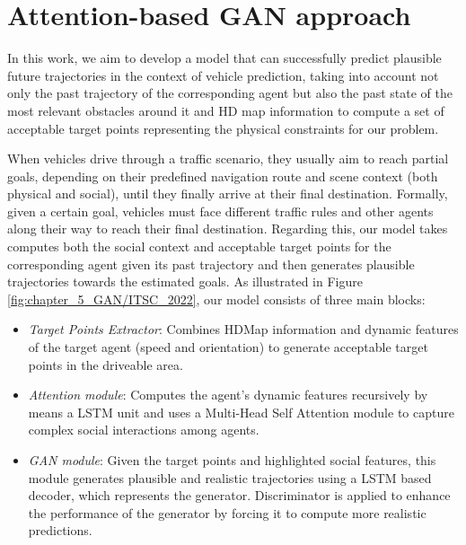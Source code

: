 \section{Attention-based GAN approach}
\label{sec:5_attention_gan}

In this work, we aim to develop a model \cite{gomez2022exploring} that can successfully predict plausible future trajectories in the context of vehicle prediction, taking into account not only the past trajectory of the corresponding agent but also the past state of the most relevant obstacles around it and HD map information to compute a set of acceptable target points representing the physical constraints for our problem.

When vehicles drive through a traffic scenario, they usually aim to reach partial goals, depending on their predefined navigation route and scene context (both physical and social), until they finally arrive at their final destination. Formally, given a certain goal, vehicles must face different traffic rules and other agents along their way to reach their final destination. Regarding this, our model takes computes both the social context and acceptable target points for the corresponding agent given its past trajectory and then generates plausible trajectories towards the estimated goals. As illustrated in Figure \ref{fig:chapter_5_GAN/ITSC_2022}, our model consists of three main blocks:

\begin{itemize}
	\item \textit{Target Points Extractor}: Combines HDMap information and dynamic features of the target agent (speed and orientation) to generate acceptable target points in the driveable area.
	\item \textit{Attention module}: Computes the agent's dynamic features recursively by means a LSTM unit and uses a Multi-Head Self Attention module to capture complex social interactions among agents.
	\item \textit{GAN module}: Given the target points and highlighted social features, this module generates plausible and realistic trajectories using a LSTM based decoder, which represents the generator. Discriminator is applied to enhance the performance of the generator by forcing it to compute more realistic predictions.
\end{itemize} 

